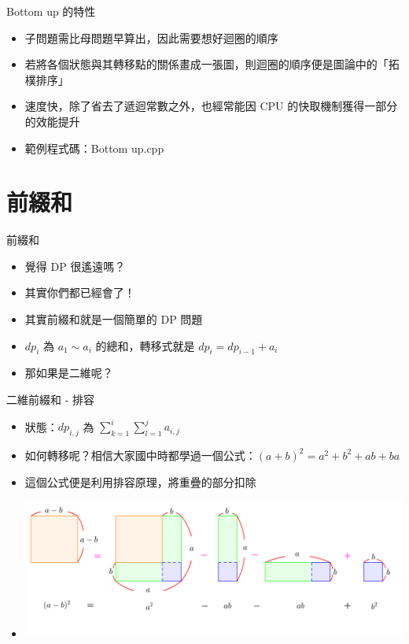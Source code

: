 \documentclass[aspectratio=169]{beamer}
\begin{document}
    \begin{frame}{Bottom up 的特性}
        \begin{itemize}
            \item 子問題需比母問題早算出，因此需要想好迴圈的順序
            \item 若將各個狀態與其轉移點的關係畫成一張圖，則迴圈的順序便是圖論中的「拓樸排序」
            \item 速度快，除了省去了遞迴常數之外，也經常能因 CPU 的快取機制獲得一部分的效能提升
            \item 範例程式碼：Bottom up.cpp
        \end{itemize}
    \end{frame}

    \section{前綴和}

    \begin{frame}{前綴和}
        \begin{itemize}
            \item<1-> 覺得 DP 很遙遠嗎？
            \item<2-> 其實你們都已經會了！
            \item<3-> 其實前綴和就是一個簡單的 DP 問題
            \item<4-> $dp_i$ 為 $a_1 \sim a_i$ 的總和，轉移式就是 $dp_i = dp_{i - 1} + a_i$
            \item<5-> 那如果是二維呢？
        \end{itemize}
    \end{frame}

    \begin{frame}{二維前綴和 - 排容}
        \begin{itemize}
            \item<1-> 狀態：$dp_{i, j}$ 為 $\displaystyle\sum_{k = 1}^{i}{\sum_{l = 1}^{j}{a_{i, j}}}$ 
            \item<2-> 如何轉移呢？相信大家國中時都學過一個公式：$(a + b)^2 = a^2 + b^2 + ab + ba$
            \item<3-> 這個公式便是利用排容原理，將重疊的部分扣除
            \item<3-> \includegraphics[width=\textwidth]{img/和平方公式.png}
        \end{itemize}
    \end{frame}
\end{document}
